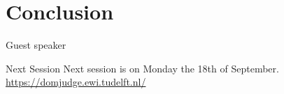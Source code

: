 \documentclass[11pt,pdf, aspectratio=169]{beamer}
\begin{document}
  \section{Conclusion}
  \begin{frame}{Guest speaker}
  \end{frame}
  \begin{frame}{Next Session}
    Next session is on Monday the 18th of September.\\

    \url{https://domjudge.ewi.tudelft.nl/}
  \end{frame}
\end{document}
